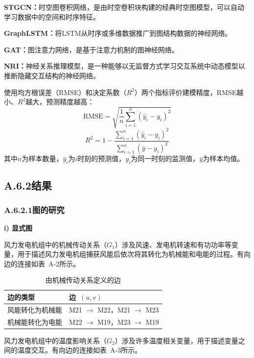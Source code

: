 \textbf{STGCN：}时空图卷积网络，是由时空卷积块构建的经典时空图模型，可以自动学习数据中的空间和时序特征。

\textbf{GraphLSTM：}将LSTM从时序或多维数据推广到图结构数据的神经网络。

\textbf{GAT：}图注意力网络，是基于注意力机制的图神经网络。

\textbf{NRI：}神经关系推理模型，是一种能够以无监督方式学习交互系统中动态模型以推断隐藏交互结构的神经网络。

使用均方根误差（RMSE）和决定系数（$R^2$）两个指标评价建模精度，RMSE越小、$R^2$越大，预测精度越高：
\begin{equation}
\mathrm{RMSE} = \sqrt{\frac{1}{n}\sum_{i=1}^{n}(\hat{y}_i - y_i)^2}
\end{equation}
\begin{equation}
R^2 = 1 - \frac{\sum_{i=1}^{n}(\hat{y}_i - y_i)^2}{\sum_{i=1}^{n}(\bar{y} - y_i)^2}
\end{equation}
其中$n$为样本数量，$\hat{y}_i$为$i$时刻的预测值，$y_i$为同一时刻的监测值，$\bar{y}$为样本均值。

\subsection*{A.6.2\quad 结果}

\subsubsection*{A.6.2.1\quad 图的研究}

\textbf{i) 显式图}

风力发电机组中的机械传动关系（$G_1$）涉及风速、发电机转速和有功功率等变量，用于描述风力发电机组捕获风能后依次将其转化为机械能和电能的过程。有向边的连接如表~A-2所示。

\begin{table}[htbp]
\centering
\caption{由机械传动关系定义的边}
\label{tab:appA-mechanical}
\small
\begin{tabular}{ll}
\toprule
边的类型 & 边~$(u, v)$ \\
\midrule
风能转化为机械能 & M21 $\rightarrow$ M22，M21 $\rightarrow$ M23 \\
机械能转化为电能 & M22 $\rightarrow$ M19，M23 $\rightarrow$ M19 \\
\bottomrule
\end{tabular}
\end{table}

风力发电机组中的温度影响关系（$G_2$）涉及许多温度相关变量，用于描述变量之间的温度交互。有向边的连接如表~A-3所示。

